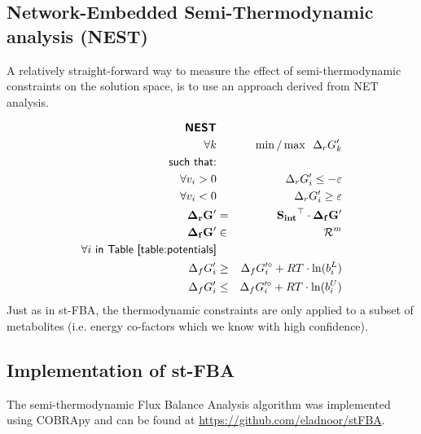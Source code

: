 \documentclass[twocolumn]{article}
\newcommand{\Sint}{\mathbf{S_{int}}}
\begin{document}
\subsection{Network-Embedded Semi-Thermodynamic analysis (NEST)}
A relatively straight-forward way to measure the effect of semi-thermodynamic constraints on the solution space, is to use an approach derived from NET analysis.

\begin{eqnarray}
\textsf{\textbf{NEST}} && \nonumber\\
\forall k && \mathrm{\min/\max} ~~\Delta_r G'_k\nonumber\\
\textsf{such that:} && \nonumber\\
\forall  v_i > 0 && \Delta_r G'_i \leq -\varepsilon \\
\forall  v_i < 0 && \Delta_r G'_i \geq \varepsilon \\
\mathbf{\Delta_r G'} &=& \Sint ^\top \cdot \mathbf{\Delta_f G'} \\
\mathbf{\Delta_f G'} &\in& \mathcal{R}^{m}\\
\forall i~\textsf{in Table \ref{table:potentials}}\nonumber\\
\Delta_f G'_i &\geq& \Delta_f G'^\circ_i + RT \cdot \ln(b^L_i) \\
\Delta_f G'_i &\leq& \Delta_f G'^\circ_i + RT \cdot \ln(b^U_i) 
\end{eqnarray}
Just as in st-FBA, the thermodynamic constraints are only applied to a subset of metabolites (i.e. energy co-factors which we know with high confidence). 


\subsection{Implementation of st-FBA}
The semi-thermodynamic Flux Balance Analysis algorithm was implemented using COBRApy \cite{Ebrahim2013-vw} and can be found at \url{https://github.com/eladnoor/stFBA}.




\end{document}
